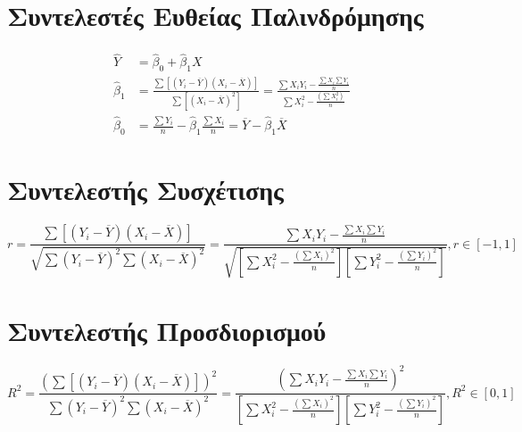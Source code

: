
\section{Συντελεστές Ευθείας Παλινδρόμησης}

\begin{align*}
  \hat{Y}&=\hat{\beta}_{0}+\hat{\beta}_{1}X \\
  \hat{\beta}_{1}&=\frac{\sum[(Y_{i}-\overline{Y})(X_{i}-\overline{X})]}{\sum[(X_{i}-\overline{X})^{2}]} = \frac{\sum X_{i}Y_{i}-\frac{\sum X_{i}\sum Y_{i}}{n}}{\sum X_{i}^{2}-\frac{(\sum X_{i}^{2})}{n}} \\
  \hat{\beta}_{0}&=\frac{\sum Y_{i}}{n}-\hat{\beta}_{1}\frac{\sum X_{i}}{n}=\overline{Y}-\hat{\beta}_{1}\overline{X}
\end{align*}

\section{Συντελεστής Συσχέτισης}

\begin{equation*}
  r=\frac{\sum[(Y_{i}-\overline{Y})(X_{i}-\overline{X})]}{\sqrt{\sum(Y_{i}-\overline{Y})^{2}\sum(X_{i}-\overline{X})^{2}}} = \frac{\sum X_{i}Y_{i}-\frac{\sum X_{i}\sum Y_{i}}{n}}{\sqrt{[\sum X_{i}^{2}-\frac{(\sum X_{i})^{2}}{n}][\sum Y_{i}^{2}-\frac{(\sum Y_{i})^{2}}{n}]}},  r\in [-1,1]
\end{equation*}

\section{Συντελεστής Προσδιορισμού}

\begin{equation*}
  R^{2}=\frac{(\sum[(Y_{i}-\overline{Y})(X_{i}-\overline{X})])^{2}}{\sum(Y_{i}-\overline{Y})^{2}\sum(X_{i}-\overline{X})^{2}} = \frac{(\sum X_{i}Y_{i}-\frac{\sum X_{i}\sum Y_{i}}{n})^{2}}{[\sum X_{i}^{2}-\frac{(\sum X_{i})^{2}}{n}][\sum Y_{i}^{2}-\frac{(\sum Y_{i})^{2}}{n}]},  R^{2}\in [0,1]
\end{equation*}
